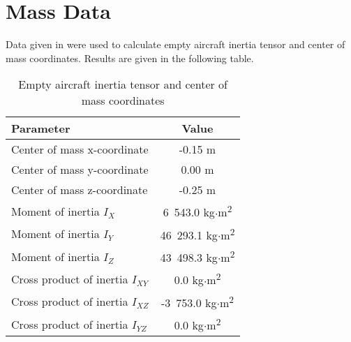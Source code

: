 \section{Mass Data}

Data given in \cite{UH60_OperatorsManual,NASA-CR-166309,UH60_MaintenanceManual} were used to calculate empty aircraft inertia tensor and center of mass coordinates. Results are given in the following table.

\begin{table}[h!]
  \begin{center}
    \begin{tabular}{ | l | c | }
      \hline
      \textbf{Parameter} & \textbf{Value} \\ \hline
      Center of mass x-coordinate & -0.15 m \\ \hline
      Center of mass y-coordinate &  0.00 m \\ \hline
      Center of mass z-coordinate & -0.25 m \\ \hline
      Moment of inertia $I_X$ &  6~543.0 kg$\cdot$m\textsuperscript{2} \\ \hline
      Moment of inertia $I_Y$ & 46~293.1 kg$\cdot$m\textsuperscript{2} \\ \hline
      Moment of inertia $I_Z$ & 43~498.3 kg$\cdot$m\textsuperscript{2} \\ \hline
      Cross product of inertia $I_{XY}$ &      0.0 kg$\cdot$m\textsuperscript{2} \\ \hline
      Cross product of inertia $I_{XZ}$ & -3~753.0 kg$\cdot$m\textsuperscript{2} \\ \hline
      Cross product of inertia $I_{YZ}$ &      0.0 kg$\cdot$m\textsuperscript{2} \\ \hline
    \end{tabular}
    \caption{Empty aircraft inertia tensor and center of mass coordinates}
  \end{center}
\end{table}

